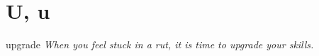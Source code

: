 \section{U, u}

\begin{word}{upgrade}
    \textit{When you feel stuck in a rut, it is time to upgrade your skills.}
\end{word}